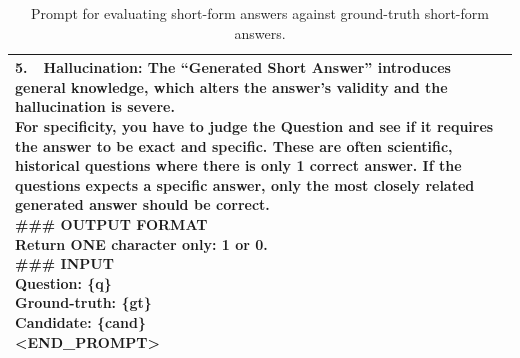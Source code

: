 \documentclass[11pt]{article}
\begin{document}
\begin{table}[t]
\begin{tabular}{@{}p{\textwidth}@{}}
{5.\ \ Hallucination: The ``Generated Short Answer'' introduces general knowledge, which alters the answer's validity and the hallucination is severe.\\
For specificity, you have to judge the Question and see if it requires the answer to be exact and specific. These are often scientific, historical questions where there is only 1 correct answer. If the questions expects a specific answer, only the most closely related generated answer should be correct.\\
\#\#\# OUTPUT FORMAT\\
Return ONE character only: 1 or 0.\\
\#\#\# INPUT\\
Question: \{q\}\\
Ground-truth: \{gt\}\\
Candidate: \{cand\}\\
\textless END\_PROMPT\textgreater\\
}\\
\hline
\end{tabular}
\caption{Prompt for evaluating short-form answers against ground-truth short-form answers.}
\label{tab:prompts-short-form-eval}
\end{table}
\end{document}
